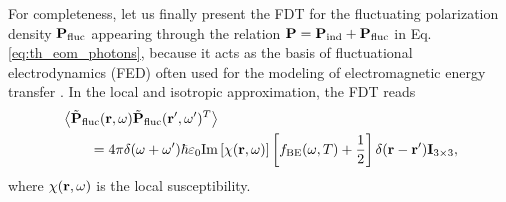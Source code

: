 For completeness, let us finally present the FDT for the fluctuating polarization density $\mathbf{P}_{\textrm{fluc}}$ appearing through the relation $\mathbf{P}=\mathbf{P}_{\textrm{ind}}+\mathbf{P}_{\textrm{fluc}}$ in Eq. \eqref{eq:th_eom_photons}, because it acts as the basis of fluctuational electrodynamics \cite{rytov,lifshitz55} (FED) often used for the modeling of electromagnetic energy transfer \cite{joulain05,volokitin07}. In the local and isotropic approximation, the FDT reads \cite{novotny}
\begin{alignat}{2}
 & \left\langle \tilde{\mathbf{P}}_{\textrm{fluc}}(\mathbf{r},\omega) \tilde{\mathbf{P}}_{\textrm{fluc}}(\mathbf{r}',\omega')^T\right\rangle \notag \\
 &\qquad = 4\pi \delta(\omega+\omega') \hbar \varepsilon_0 \textrm{Im}\left[ \chi(\mathbf{r},\omega)\right] \left[f_{\textrm{BE}}(\omega,T)+\frac{1}{2}\right] \delta(\mathbf{r}-\mathbf{r}') \mathbf{I}_{3 \times 3}, \label{eq:th_PflucPfluc}
\end{alignat}
where $\chi(\mathbf{r},\omega)$ is the local susceptibility. %


